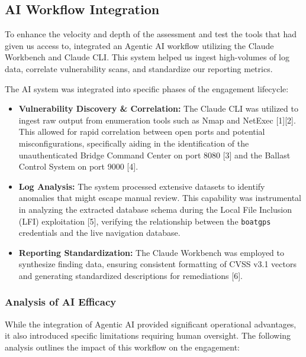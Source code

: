 \subsection{AI Workflow Integration}

To enhance the velocity and depth of the assessment and test the tools that \client had given us access to, \team integrated an Agentic AI workflow utilizing the Claude Workbench and Claude CLI. This system helped us ingest high-volumes of log data, correlate vulnerability scans, and standardize our reporting metrics.  

The AI system was integrated into specific phases of the engagement lifecycle:

\begin{itemize}
    \item \textbf{Vulnerability Discovery \& Correlation:} The Claude CLI was utilized to ingest raw output from enumeration tools such as Nmap and NetExec [1][2]. This allowed for rapid correlation between open ports and potential misconfigurations, specifically aiding in the identification of the unauthenticated Bridge Command Center on port 8080 [3] and the Ballast Control System on port 9000 [4].
    \item \textbf{Log Analysis:} The system processed extensive datasets to identify anomalies that might escape manual review. This capability was instrumental in analyzing the extracted database schema during the Local File Inclusion (LFI) exploitation [5], verifying the relationship between the \texttt{boatgps} credentials and the live navigation database.
    \item \textbf{Reporting Standardization:} The Claude Workbench was employed to synthesize finding data, ensuring consistent formatting of CVSS v3.1 vectors and generating standardized descriptions for remediations [6].
\end{itemize}

\subsubsection{Analysis of AI Efficacy}
While the integration of Agentic AI provided significant operational advantages, it also introduced specific limitations requiring human oversight. The following analysis outlines the impact of this workflow on the engagement:

